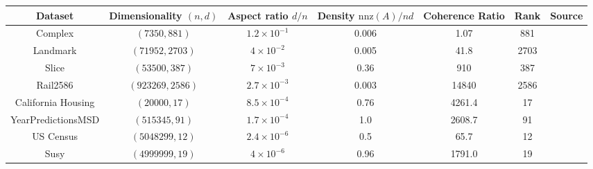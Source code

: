\documentclass[twoside]{article}
\newcommand{\nnz}[1]{\text{nnz}(#1)}
\theoremstyle{definition}\newtheorem{thm}{Theorem}[section]
\theoremstyle{definition}\newtheorem{mydef}[thm]{Definition}
\theoremstyle{definition}\newtheorem{rem}[thm]{Remark}
\theoremstyle{definition}\newtheorem{prop}[thm]{Proposition}
\theoremstyle{definition}\newtheorem{example}[thm]{Example}
\theoremstyle{definition}\newtheorem{claim}[thm]{Claim}
\theoremstyle{definition}\newtheorem{Qu}[thm]{Question}
\theoremstyle{definition}\newtheorem{Lemma}[thm]{Lemma}
\theoremstyle{definition}\newtheorem{Cor}[thm]{Corollary}
\theoremstyle{definition}\newtheorem{Fact}[]{Fact}
\begin{document}
\begin{table}[ht]
\centering
\begin{adjustbox}{width=1\textwidth}

\begin{tabular}{|c|c|c|c|c|c|c|}
  \hline
Dataset                   & Dimensionality  $(n,d)$      &   Aspect ratio $d/n$ & Density $\nnz{A}/nd$ &  Coherence Ratio & Rank & Source \\
\hline

Complex       & $(7350, 881)$         &   $1.2 \times 10^{-1} $      &  0.006                 & 1.07                & 881    &   \cite{davis2011university}      \\

Landmark        & $(71952, 2703)$         &   $4 \times 10^{-2} $      &  0.005                 & 41.8                & 2703    &   \cite{davis2011university}      \\

  Slice                   & $(53500, 387)$         &   $7 \times 10^{-3} $      &  0.36                 &                          910                 & 387    &   \cite{Dua:2017}       \\

Rail2586                 & $(923269, 2586)$      &   $2.7 \times 10^{-3} $      &  0.003                &  14840                & 2586    &   \cite{davis2011university} \\

California Housing       & $(20000, 17)$         &   $8.5 \times 10^{-4} $      &  0.76                 & 4261.4                 & 17    &   \cite{geron2017hands}      \\


YearPredictionsMSD       & $(515345,91)$         &   $1.7 \times 10^{-4} $      & 1.0                  &  2608.7                 &  91   &  \cite{Dua:2017}             \\

US Census                & $(5048299, 12)$         & $2.4 \times 10^{-6}$       &
0.5                 &    65.7           &  12 &  \cite{census2000}\\



Susy            & $(4999999, 19)$         &   $4 \times 10^{-6} $      &  0.96                 & 1791.0                & 19    &   \cite{Dua:2017}       \\









\end{tabular}
\end{adjustbox}
\end{table}
\end{document}
